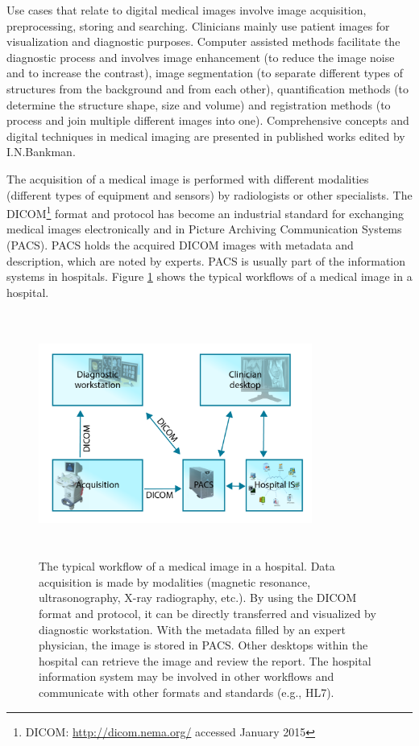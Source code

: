 Use cases that relate to digital medical images involve image acquisition, preprocessing, storing and searching.
Clinicians mainly use patient images for visualization and diagnostic purposes. Computer assisted methods facilitate the diagnostic process and involves image enhancement (to reduce the image noise and to increase the contrast), image segmentation (to separate different types of structures from the background and from each other), quantification methods (to determine the structure shape, size and volume) and registration methods (to process and join multiple different images into one).
Comprehensive concepts and digital techniques in medical imaging are presented in published works edited by I.N.Bankman\cite{Bankman2000}.

The acquisition of a medical image is performed with different modalities (different types of equipment and sensors) by radiologists or other specialists. The DICOM\footnote{DICOM: \url{http://dicom.nema.org/} accessed January 2015} format and protocol has become an industrial standard for exchanging medical images electronically and in Picture Archiving Communication Systems (PACS). PACS holds the acquired DICOM images with metadata and description, which are  noted by experts. PACS is usually part of the information systems in hospitals. Figure \ref{fig:pacs} shows the typical workflows of a medical image in a hospital.

\begin{figure}[ht]
    \centering
    \includegraphics[width=0.8\textwidth, height=8cm]{img/chapter3-pacs.png}
    \caption{The typical workflow of a medical image in a hospital. Data acquisition is made by modalities (magnetic resonance, ultrasonography, X-ray radiography, etc.). By using the DICOM format and protocol, it can be directly transferred and visualized by diagnostic workstation. With the metadata filled by an expert physician, the image is stored in PACS. Other desktops within the hospital can retrieve the image and review the report. The hospital information system may be involved in other workflows and communicate with other formats and standards (e.g., HL7).
    }
    \label{fig:pacs}
\end{figure}

